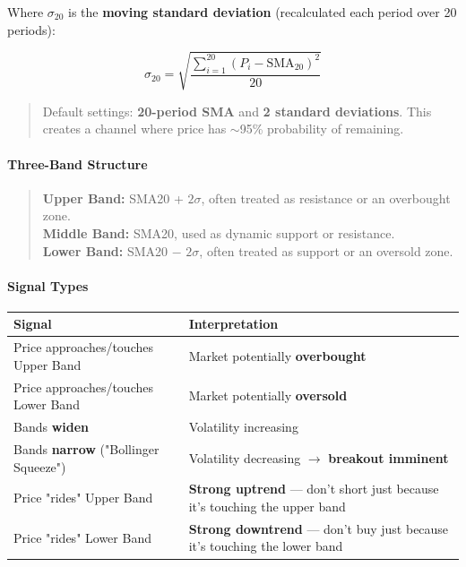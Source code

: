 \documentclass[12pt,openany]{book}
\begin{document}
Where \(\sigma_{20}\) is the \textbf{moving standard deviation} (recalculated each period over 20 periods):

\[
\sigma_{20} = \sqrt{\frac{\sum_{i=1}^{20}(P_i - \text{SMA}_{20})^2}{20}}
\]

\begin{quote}
Default settings: \textbf{20-period SMA} and \textbf{2 standard deviations}. This creates a channel where price has \(\sim\)95\% probability of remaining.

\end{quote}
\paragraph{Three-Band Structure}

\begin{quote}
\textbf{Upper Band:} SMA20 + \(2\sigma\), often treated as resistance or an overbought zone.\\
\textbf{Middle Band:} SMA20, used as dynamic support or resistance.\\
\textbf{Lower Band:} SMA20 \(-\) \(2\sigma\), often treated as support or an oversold zone.
\end{quote}

\paragraph{Signal Types}

\begin{center}
\small
\renewcommand{\arraystretch}{1.2}
\begin{tabular}{|L{0.30\textwidth}|L{0.60\textwidth}|}
\hline
 \textbf{Signal} & \textbf{Interpretation} \\ \hline
 Price approaches/touches Upper Band & Market potentially \textbf{overbought} \\ \hline
 Price approaches/touches Lower Band & Market potentially \textbf{oversold} \\ \hline
 Bands \textbf{widen} & Volatility increasing \\ \hline
 Bands \textbf{narrow} ("Bollinger Squeeze") & Volatility decreasing \(\rightarrow\) \textbf{breakout imminent} \\ \hline
 Price "rides" Upper Band & \textbf{Strong uptrend} --- don't short just because it's touching the upper band \\ \hline
 Price "rides" Lower Band & \textbf{Strong downtrend} --- don't buy just because it's touching the lower band \\ \hline
\end{tabular}
\end{center}
\end{document}
